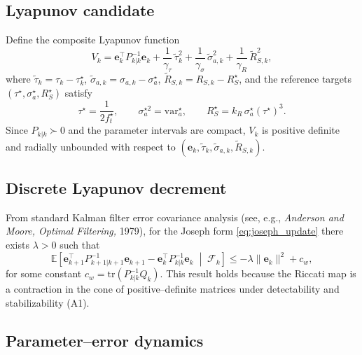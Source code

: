 \documentclass[10pt]{extarticle}
\begin{document}
\subsection{Lyapunov candidate}

Define the composite Lyapunov function
\begin{equation}
V_k =
\boldsymbol{e}_k^{\!\top} P_{k|k}^{-1} \boldsymbol{e}_k
+ \frac{1}{\gamma_\tau}\,\tilde\tau_k^2
+ \frac{1}{\gamma_\sigma}\,\tilde\sigma_{a,k}^2
+ \frac{1}{\gamma_R}\,\tilde R_{S,k}^2,
\label{eq:lyapunov}
\end{equation}
where
$\tilde\tau_k = \tau_k - \tau_k^\star$,
$\tilde\sigma_{a,k} = \sigma_{a,k} - \sigma_a^\star$,
$\tilde R_{S,k} = R_{S,k} - R_S^\star$,
and the reference targets
$(\tau^\star, \sigma_a^\star, R_S^\star)$
satisfy
\[
\tau^\star = \frac{1}{2 f_t^\star},\qquad
\sigma_a^{\star 2} = \mathrm{var}_a^\star,\qquad
R_S^\star = k_R\,\sigma_a^\star (\tau^\star)^3.
\]
Since $P_{k|k}\succ 0$ and the parameter intervals are compact, $V_k$ is positive definite and radially unbounded with respect to $(\boldsymbol{e}_k, \tilde\tau_k, \tilde\sigma_{a,k}, \tilde R_{S,k})$.

\subsection{Discrete Lyapunov decrement}

From standard Kalman filter error covariance analysis
(see, e.g., \emph{Anderson and Moore, Optimal Filtering,} 1979),
for the Joseph form \eqref{eq:joseph_update} there exists $\lambda>0$ such that
\begin{equation}
\mathbb{E}\!\left[
\boldsymbol{e}_{k+1}^{\!\top} P_{k+1|k+1}^{-1} \boldsymbol{e}_{k+1}
- \boldsymbol{e}_{k}^{\!\top} P_{k|k}^{-1} \boldsymbol{e}_{k}
\;\middle|\; \mathcal F_k \right]
\le -\lambda \|\boldsymbol{e}_k\|^2 + c_w,
\label{eq:state_decrement}
\end{equation}
for some constant $c_w = \mathrm{tr}(P_{k|k}^{-1} Q_k)$.
This result holds because the Riccati map is a contraction in the cone of positive–definite matrices under detectability and stabilizability (A1).

\subsection{Parameter–error dynamics}
\end{document}
